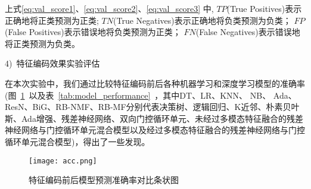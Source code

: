 上式\ref{eq:val_score1}、\ref{eq:val_score2}、\ref{eq:val_score3}%
中,
$TP$(True Positives)表示正确地将正类预测为正类;
$TN$(True Negatives)表示正确地将负类预测为负类；
$FP$(False Positives)表示错误地将负类预测为正类；
$FN$(False Negatives)表示错误地将正类预测为负类。

4)~特征编码效果实验评估\par
在本次实验中，我们通过比较特征编码前后各种机器学习和深度学习模型的准确率(图~\ref{fig:comapre_accuracy_encoding}~以及表~\ref{tab:model_performance}~，其中DT、LR、KNN、 NB、 Ada、ResN、BiG、RB-NMF、RB-MF分别代表决策树、逻辑回归、K近邻、朴素贝叶斯、Ada增强、残差神经网络、双向门控循环单元、未经过多模态特征融合的残差神经网络与门控循环单元混合模型以及经过多模态特征融合的残差神经网络与门控循环单元混合模型)，得出了一些发现。
\begin{figure}[htbp]
	\centering
	\texttt{[image: acc.png]}
	\caption{特征编码前后模型预测准确率对比条状图}
	\label{fig:comapre_accuracy_encoding}
\end{figure}
